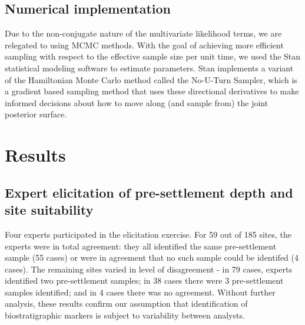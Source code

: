 \documentclass[12pt]{article}
\begin{document}
\subsection{Numerical implementation}

Due to the non-conjugate nature of the multivariate likelihood terms,
we are relegated to using MCMC methods. With the goal of achieving
more efficient sampling with respect to the effective sample size per
unit time, we used the Stan statistical modeling software to estimate
parameters. Stan implements a variant of the Hamiltonian Monte Carlo
method called the No-U-Turn Sampler, which is a gradient based sampling
method that uses these directional derivatives to make informed
decisions about how to move along (and sample from) the joint
posterior surface. 



\section{Results}

\subsection{Expert elicitation of pre-settlement depth and site suitability}

Four experts participated in the elicitation exercise. For 59 out of
185 sites, the experts were in total agreement: they all identified
the same pre-settlement sample (55 cases) or were in agreement that no
such sample could be identifed (4 cases). The remaining sites varied
in level of disagreement - in 79 cases, experts identified two
pre-settlement samples; in 38 cases there were 3 pre-settlement
samples identified; and in 4 cases there was no agreement. Without
further analysis, these results confirm our assumption that
identification of biostratigraphic markers is subject to variability
between analysts. 
\end{document}
